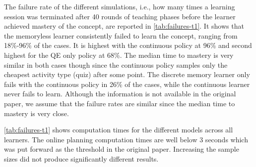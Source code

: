 The failure rate of the different simulations, i.e., how many times a learning session was terminated after 40 rounds of teaching phases before the learner achieved mastery of the concept, are reported in \autoref{tab:failures-t1}. 
It shows that the memoryless learner consistently failed to learn the concept, ranging from 18\%-96\% of the cases.
It is highest with the continuous policy at 96\% and second highest for the QE only policy at 68\%. The median time to mastery is very similar in both cases though since the continuous policy samples only the cheapest activity type (quiz) after some point.
The discrete memory learner only fails with the continuous policy in 26\% of the cases, while the continuous learner never fails to learn.
Although the information is not available in the original paper, we assume that the failure rates are similar since the median time to mastery is very close.



\autoref{tab:failures-t1} shows computation times for the different models across all learners. 
The online planning computation times are well below 3 seconds which was put forward as the threshold in the original paper. 
Increasing the sample sizes did not produce significantly different results. 


